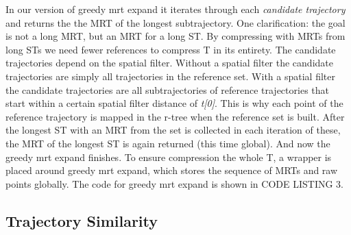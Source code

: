 In our version of greedy mrt expand it iterates through each \textit{candidate trajectory} and returns the the MRT of the longest subtrajectory. One clarification: the goal is not a long MRT, but an MRT for a long ST. By compressing with MRTs from long STs we need fewer references to compress T in its entirety. The candidate trajectories depend on the spatial filter. Without a spatial filter the candidate trajectories are simply all trajectories in the reference set. With a spatial filter the candidate trajectories are all subtrajectories of reference trajectories that start within a certain spatial filter distance of \textit{t[0]}. This is why each point of the reference trajectory is mapped in the r-tree when the reference set is built. After the longest ST with an MRT from the set is collected in each iteration of these, the MRT of the longest ST is again returned (this time global). And now the greedy mrt expand finishes. To ensure compression the whole T, a wrapper is placed around greedy mrt expand, which stores the sequence of MRTs and raw points globally. The code for greedy mrt expand is shown in CODE LISTING 3.
\subsection{Trajectory Similarity}